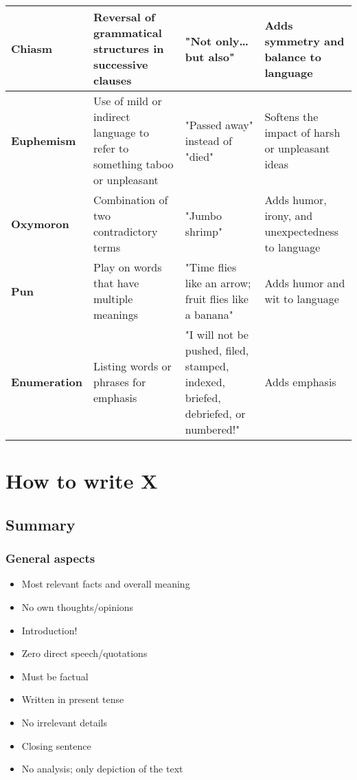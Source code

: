\documentclass{article}
\begin{document}
\begin{center}
\begin{tabular}{ | p{8em} | p{12em} | p{12em} | p{12em} | }
			\hline
			\textbf{Chiasm} & Reversal of grammatical structures in successive clauses & "Not only… but also" & Adds symmetry and balance to language \\
			\hline
			\textbf{Euphemism} & Use of mild or indirect language to refer to something taboo or unpleasant & "Passed away" instead of "died" & Softens the impact of harsh or unpleasant ideas \\
			\hline
			\textbf{Oxymoron} & Combination of two contradictory terms & "Jumbo shrimp" & Adds humor, irony, and unexpectedness to language \\
			\hline
			\textbf{Pun} & Play on words that have multiple meanings & "Time flies like an arrow; fruit flies like a banana" & Adds humor and wit to language \\
			\hline
			\textbf{Enumeration} & Listing words or phrases for emphasis & "I will not be pushed, filed, stamped, indexed, briefed, debriefed, or numbered!" & Adds emphasis \\
			\hline
		\end{tabular}
	\end{center}

	\section{How to write X}

	\subsection{Summary}
	\subsubsection{General aspects}
	\begin{itemize}
		\item Most relevant facts and overall meaning
		\item No own thoughts/opinions
		\item Introduction!
		\item Zero direct speech/quotations
		\item Must be factual
		\item Written in present tense
		\item No irrelevant details
		\item Closing sentence
		\item No analysis; only depiction of the text
	\end{itemize}
\end{document}
